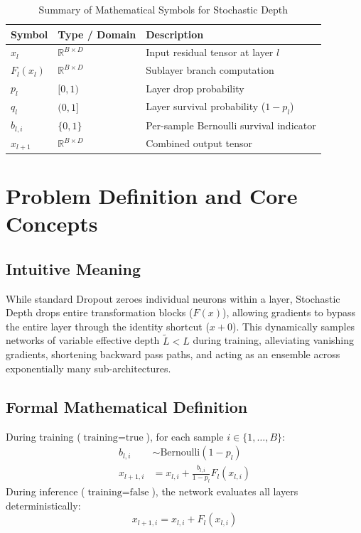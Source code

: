 \documentclass[11pt,a4paper]{article}
\theoremstyle{definition}
\begin{document}
\begin{table}[h]
\centering
\caption{Summary of Mathematical Symbols for Stochastic Depth}
\begin{tabular}{lll}
\toprule
\textbf{Symbol} & \textbf{Type / Domain} & \textbf{Description} \\
\midrule
$x_l$ & $\mathbb{R}^{B \times D}$ & Input residual tensor at layer $l$ \\
$F_l(x_l)$ & $\mathbb{R}^{B \times D}$ & Sublayer branch computation \\
$p_l$ & $[0, 1)$ & Layer drop probability \\
$q_l$ & $(0, 1]$ & Layer survival probability ($1 - p_l$) \\
$b_{l, i}$ & $\{0, 1\}$ & Per-sample Bernoulli survival indicator \\
$x_{l+1}$ & $\mathbb{R}^{B \times D}$ & Combined output tensor \\
\bottomrule
\end{tabular}
\end{table}

\section{Problem Definition and Core Concepts}

\subsection{Intuitive Meaning}
While standard Dropout zeroes individual neurons within a layer, Stochastic Depth drops entire transformation blocks ($F(x)$), allowing gradients to bypass the entire layer through the identity shortcut ($x + 0$). This dynamically samples networks of variable effective depth $\tilde{L} < L$ during training, alleviating vanishing gradients, shortening backward pass paths, and acting as an ensemble across exponentially many sub-architectures.

\subsection{Formal Mathematical Definition}
During training ($\text{training} = \text{true}$), for each sample $i \in \{1, \dots, B\}$:
\begin{align}
b_{l, i} &\sim \text{Bernoulli}(1 - p_l) \\
x_{l+1, i} &= x_{l, i} + \frac{b_{l, i}}{1 - p_l} F_l(x_{l, i})
\end{align}
During inference ($\text{training} = \text{false}$), the network evaluates all layers deterministically:
\begin{equation}
x_{l+1, i} = x_{l, i} + F_l(x_{l, i})
\end{equation}
\end{document}
